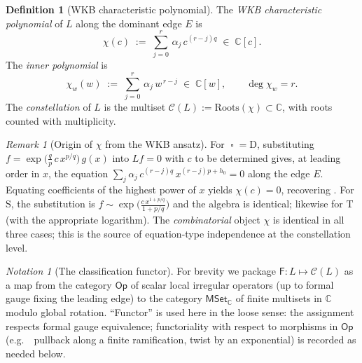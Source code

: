 \documentclass[aip,jmp,preprint,amsmath,amssymb,nofootinbib,floatfix]{revtex4-2}
\theoremstyle{plain}
\theoremstyle{definition}
\newtheorem{definition}[theorem]{Definition}
\theoremstyle{remark}
\newtheorem{remark}[theorem]{Remark}
\newtheorem{notation}[theorem]{Notation}
\newcommand{\op}{\mathop{\square}}                %
\newcommand{\opD}{\mathrm{D}}                     %
\newcommand{\opS}{\mathrm{S}}                     %
\newcommand{\opT}{\mathrm{T}}                     %
\newcommand{\Roots}{\mathrm{Roots}}
\newcommand{\Cl}{\mathcal{C}}
\newcommand{\Fclass}{\mathsf{F}}
\newcommand{\eg}{e.g.\ }
\begin{document}
\begin{definition}[WKB characteristic polynomial]\label{def:chi}
The \emph{WKB characteristic polynomial} of $L$ along the dominant edge $E$
is
\[
   \chi(c)
   \;:=\;
   \sum_{j=0}^{r}\, \alpha_j\, c^{(r-j)q}
   \;\in\; \mathbb{C}[c].
\]
The \emph{inner polynomial} is
\[
   \chi_w(w)
   \;:=\;
   \sum_{j=0}^{r}\, \alpha_j\, w^{\,r-j}
   \;\in\; \mathbb{C}[w],
   \qquad \deg \chi_w = r.
\]
The \emph{constellation} of $L$ is the multiset
$\Cl(L) := \Roots(\chi) \subset \mathbb{C}$, with roots counted with
multiplicity.
\end{definition}

\begin{remark}[Origin of $\chi$ from the WKB ansatz]\label{rem:chi-from-ansatz}
For $\op = \opD$, substituting $f = \exp\!\big(\frac{q}{p}\, c\, x^{p/q}\big)\,
g(x)$ into $L f = 0$ with $c$ to be determined gives, at leading order in
$x$, the equation $\sum_j \alpha_j\, c^{(r-j)q}\, x^{(r-j)p + h_0} = 0$ along
the edge $E$. Equating coefficients of the highest power of $x$ yields
$\chi(c) = 0$, recovering . For $\opS$, the substitution is
$f \sim \exp\!\big(\frac{c\, x^{1 + p/q}}{1 + p/q}\big)$ and the algebra is
identical; likewise for $\opT$ (with the appropriate logarithm). The
\emph{combinatorial} object $\chi$ is identical in all three cases; this
is the source of equation-type independence at the constellation level.
\end{remark}

\begin{notation}[The classification functor]\label{not:F}
For brevity we package $\Fclass \colon L \mapsto \Cl(L)$ as a map from the
category $\mathsf{Op}$ of scalar local irregular operators (up to formal
gauge fixing the leading edge) to the category $\mathsf{MSet}_\mathbb{C}$
of finite multisets in $\mathbb{C}$ modulo global rotation. ``Functor'' is
used here in the loose sense: the assignment respects formal gauge
equivalence; functoriality with respect to morphisms in $\mathsf{Op}$
(\eg\ pullback along a finite ramification, twist by an exponential)
is recorded as needed below.
\end{notation}
\end{document}

